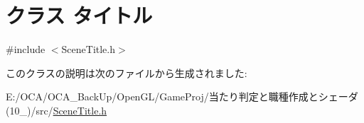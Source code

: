 \hypertarget{class_xE3_x82_xBF_xE3_x82_xA4_xE3_x83_x88_xE3_x83_xAB}{\section{クラス タイトル}
\label{class_xE3_x82_xBF_xE3_x82_xA4_xE3_x83_x88_xE3_x83_xAB}
}


{\ttfamily \#include $<$Scene\-Title.\-h$>$}



このクラスの説明は次のファイルから生成されました\-:\begin{DoxyCompactItemize}
\item 
E\-:/\-O\-C\-A/\-O\-C\-A\-\_\-\-Back\-Up/\-Open\-G\-L/\-Game\-Proj/当たり判定と職種作成とシェーダ(10\-\_)/src/\hyperlink{_scene_title_8h}{Scene\-Title.\-h}\end{DoxyCompactItemize}
